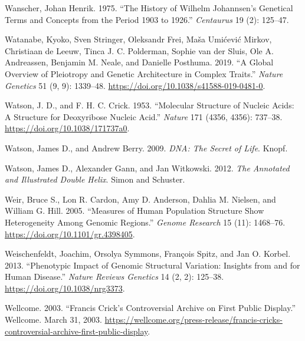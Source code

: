 \documentclass[
]{book}
\newlength{\cslhangindent}
\newlength{\cslentryspacingunit} %
\newenvironment{CSLReferences}[2] %
 {%
  \setlength{\parindent}{0pt}
  \ifodd #1
  \let\oldpar\par
  \def\par{\hangindent=\cslhangindent\oldpar}
  \fi
  \setlength{\parskip}{#2\cslentryspacingunit}
 }%
 {}
\begin{document}
\begin{CSLReferences}{1}{0}
\leavevmode{}%
Wanscher, Johan Henrik. 1975. {``The History of {Wilhelm Johannsen}'s Genetical Terms and Concepts from the Period 1903 to 1926.''} \emph{Centaurus} 19 (2): 125--47.

\leavevmode{}%
Watanabe, Kyoko, Sven Stringer, Oleksandr Frei, Maša Umićević Mirkov, Christiaan de Leeuw, Tinca J. C. Polderman, Sophie van der Sluis, Ole A. Andreassen, Benjamin M. Neale, and Danielle Posthuma. 2019. {``A Global Overview of Pleiotropy and Genetic Architecture in Complex Traits.''} \emph{Nature Genetics} 51 (9, 9): 1339--48. \url{https://doi.org/10.1038/s41588-019-0481-0}.

\leavevmode{}%
Watson, J. D., and F. H. C. Crick. 1953. {``Molecular {Structure} of {Nucleic Acids}: {A Structure} for {Deoxyribose Nucleic Acid}.''} \emph{Nature} 171 (4356, 4356): 737--38. \url{https://doi.org/10.1038/171737a0}.

\leavevmode{}%
Watson, James D., and Andrew Berry. 2009. \emph{{DNA}: {The} Secret of Life}. {Knopf}.

\leavevmode{}%
Watson, James D., Alexander Gann, and Jan Witkowski. 2012. \emph{The Annotated and Illustrated Double Helix}. {Simon and Schuster}.

\leavevmode{}%
Weir, Bruce S., Lon R. Cardon, Amy D. Anderson, Dahlia M. Nielsen, and William G. Hill. 2005. {``Measures of Human Population Structure Show Heterogeneity Among Genomic Regions.''} \emph{Genome Research} 15 (11): 1468--76. \url{https://doi.org/10.1101/gr.4398405}.

\leavevmode{}%
Weischenfeldt, Joachim, Orsolya Symmons, François Spitz, and Jan O. Korbel. 2013. {``Phenotypic Impact of Genomic Structural Variation: Insights from and for Human Disease.''} \emph{Nature Reviews Genetics} 14 (2, 2): 125--38. \url{https://doi.org/10.1038/nrg3373}.

\leavevmode{}%
Wellcome. 2003. {``Francis {Crick}'s Controversial Archive on First Public Display.''} {Wellcome}. March 31, 2003. \url{https://wellcome.org/press-release/francis-cricks-controversial-archive-first-public-display}.


\end{CSLReferences}
\end{document}
